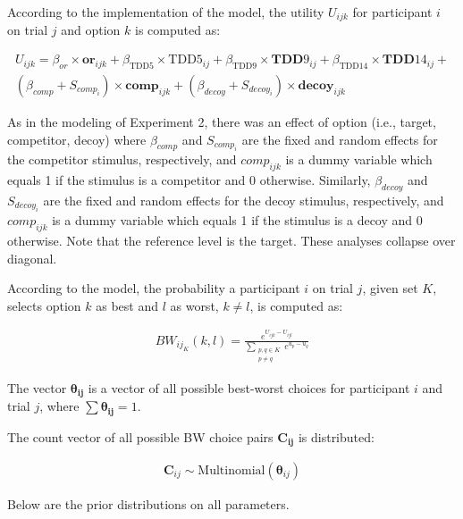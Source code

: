 According to the implementation of the model, the utility $U_{ijk}$ for participant $i$ on trial $j$ and option $k$ is computed as:

\begin{equation}
    \begin{aligned}
        U_{ijk}=\beta_{or} \times \bm{or}_{ijk} + \beta_{\mathrm{TDD}5} \times \mathrm{TDD}5_{ij} +\beta_{\mathrm{TDD}9} \times \bm{TDD}9_{ij} + \beta_{\mathrm{TDD}14} \times \bm{TDD}14_{ij}+\\
        (\beta_{comp}+S_{comp_i}) \times \bm{comp}_{ijk}+(\beta_{decoy}+S_{decoy_i}) \times \bm{decoy}_{ijk}
        \label{maxdiff_U}
    \end{aligned}
\end{equation}

As in the modeling of Experiment 2, there was an effect of option (i.e., target, competitor, decoy) where $\beta_{comp}$ and $S_{comp_i}$ are the fixed and random effects for the competitor stimulus, respectively, and $comp_{ijk}$ is a dummy variable which equals 1 if the stimulus is a competitor and 0 otherwise. Similarly, $\beta_{decoy}$ and $S_{decoy_i}$ are the fixed and random effects for the decoy stimulus, respectively, and $comp_{ijk}$ is a dummy variable which equals 1 if the stimulus is a decoy and 0 otherwise. Note that the reference level is the target. These analyses collapse over diagonal.

According to the model, the probability a participant $i$ on trial $j$, given set $K$, selects option $k$ as best and $l$ as worst, $k \neq l$, is computed as:

\begin{align}
    BW_{ij_{K}}(k,l)=\frac{e^{U_{ijk}-U_{ijl}}}{\sum_{\substack{{p,q}\in K\\p \neq q}} e^{u_{p}-u_{q}}}
\end{align}

The vector $\boldsymbol{\theta_{ij}}$ is a vector of all possible best-worst choices for participant $i$ and trial $j$, where $\sum \boldsymbol{\theta_{ij}} = 1$.

The count vector of all possible BW choice pairs $\boldsymbol{C_{ij}}$ is distributed:

\begin{align}
    \boldsymbol{C}_{ij} \sim \text{Multinomial}(\boldsymbol{\theta}_{ij})
\end{align}


Below are the prior distributions on all parameters.

